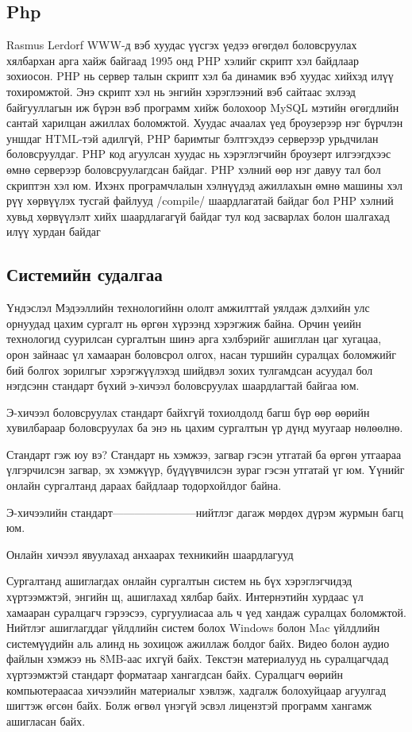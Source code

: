 	\subsection{Php}
	  Rasmus Lerdorf WWW-д вэб хуудас үүсгэх үедээ өгөгдөл боловсруулах хялбархан арга хайж байгаад 1995 онд PHP хэлийг скрипт хэл байдлаар зохиосон.
	PHP нь сервер талын скрипт хэл ба динамик вэб хуудас хийхэд илүү тохиромжтой. Энэ скрипт хэл нь энгийн хэрэглээний вэб сайтаас эхлээд байгууллагын иж бүрэн вэб программ хийж болохоор MySQL мэтийн өгөгдлийн сантай харилцан ажиллах боломжтой.
	Хуудас ачаалах үед броузерээр нэг бүрчлэн уншдаг HTML-тэй адилгүй, PHP баримтыг бэлтгэхдээ серверээр урьдчилан боловсруулдаг. PHP код агуулсан хуудас нь хэрэглэгчийн броузерт илгээгдхээс өмнө серверээр боловсруулагдсан байдаг.
	PHP хэлний өөр нэг давуу тал бол скриптэн хэл юм. Ихэнх програмчлалын хэлнүүдэд ажиллахын өмнө машины хэл рүү хөрвүүлэх тусгай файлууд /compile/ шаардлагатай байдаг бол PHP хэлний хувьд хөрвүүлэлт хийх шаардлагагүй байдаг тул код засварлах болон шалгахад илүү хурдан байдаг
	
	\subsection{Системийн судалгаа}
	Үндэслэл
		Мэдээллийн технологийнн ололт амжилттай уялдаж дэлхийн улс орнуудад цахим сургалт нь өргөн хүрээнд хэрэгжиж байна.
		Орчин үеийн технологид суурилсан сургалтын шинэ арга хэлбэрийг ашигллан цаг хугацаа, орон зайнаас үл хамааран боловсрол олгох, насан туршийн суралцах боломжийг бий болгох зорилгыг хэрэгжүүлэхэд шийдвэл зохих тулгамдсан асуудал бол нэгдсэнн стандарт бүхий э-хичээл боловсруулах шаардлагтай байгаа юм.
		
		Э-хичээл боловсруулах стандарт байхгүй тохиолдолд багш бүр өөр өөрийн хувилбараар боловсруулах ба энэ нь цахим сургалтын үр дүнд муугаар нөлөөлнө.
		
	Стандарт гэж юу вэ? 
		Стандарт нь хэмжээ, загвар гэсэн утгатай ба өргөн утгаараа үлгэрчилсэн загвар, эх хэмжүүр, бүдүүвчилсэн зураг гэсэн утгатай үг юм. Үүнийг онлайн сургалтанд дараах байдлаар тодорхойлдог байна. 
		
		Э-хичээлийн стандарт-----------------------нийтлэг дагаж мөрдөх дүрэм журмын багц юм. 
		
	Онлайн хичээл явуулахад анхаарах техникийн шаардлагууд
	
		Сургалтанд ашиглагдах онлайн сургалтын систем нь бүх хэрэглэгчидэд хүртээмжтэй, энгийн щ, ашиглахад хялбар байх. 
		Интернэтийн хурдаас үл хамааран суралцагч гэрээсээ, сургуулиасаа аль ч үед хандаж суралцах боломжтой. 
		Нийтлэг ашиглагддаг үйлдлийн систем болох Windows болон Mac үйлдлийн системүүдийн аль алинд нь зохицож ажиллаж болдог байх.
		Видео болон аудио файлын хэмжээ нь 8MB-аас ихгүй байх.
		Текстэн материалууд нь суралцагчдад хүртээмжтэй стандарт форматаар хангагдсан байх.
		Суралцагч өөрийн компьютераасаа хичээлийн материалыг хэвлэж, хадгалж болохуйцаар агуулгад шигтэж өгсөн байх.
		Болж өгвөл үнэгүй эсвэл лицензтэй программ хангамж ашигласан байх.
		
